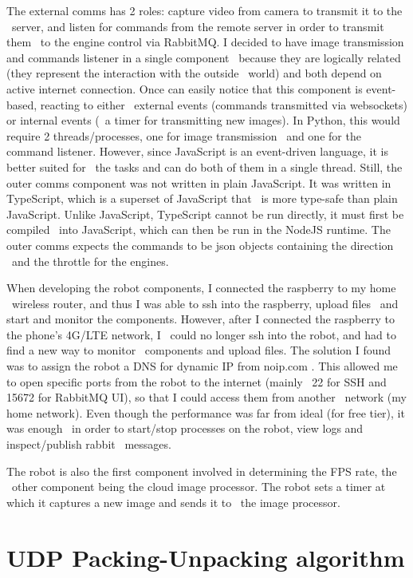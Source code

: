 The external comms has 2 roles: capture video from camera to transmit it to the \
server, and listen for commands from the remote server in order to transmit them \
to the engine control via RabbitMQ.
I decided to have image transmission and commands listener in a single component \
because they are logically related (they represent the interaction with the outside \
world) and both depend on active internet connection.
Once can easily notice that this component is event-based, reacting to either \
external events (commands transmitted via websockets) or internal events (\
a timer for transmitting new images).
In Python, this would require 2 threads/processes, one for image transmission \
and one for the command listener.
However, since JavaScript is an event-driven language, it is better suited for \
the tasks and can do both of them in a single thread.
Still, the outer comms component was not written in plain JavaScript.
It was written in TypeScript, which is a superset of JavaScript that \
is more type-safe than plain JavaScript.
Unlike JavaScript, TypeScript cannot be run directly, it must first be compiled \
into JavaScript, which can then be run in the NodeJS runtime.
The outer comms expects the commands to be json objects containing the direction \
and the throttle for the engines.


When developing the robot components, I connected the raspberry to my home \
wireless router, and thus I was able to ssh into the raspberry, upload files \
and start and monitor the components.
However, after I connected the raspberry to the phone's 4G/LTE network, I \
could no longer ssh into the robot, and had to find a new way to monitor \
components and upload files.
The solution I found was to assign the robot a DNS for dynamic IP from noip.com .
This allowed me to open specific ports from the robot to the internet (mainly \
22 for SSH and 15672 for RabbitMQ UI), so that I could access them from another \
network (my home network).
Even though the performance was far from ideal (for free tier), it was enough \
in order to start/stop processes on the robot, view logs and inspect/publish rabbit \
messages.

The robot is also the first component involved in determining the FPS rate, the \
other component being the cloud image processor.
The robot sets a timer at which it captures a new image and sends it to \
the image processor.

\section{UDP Packing-Unpacking algorithm}
\label{sec:udp-packing-algorithm}


